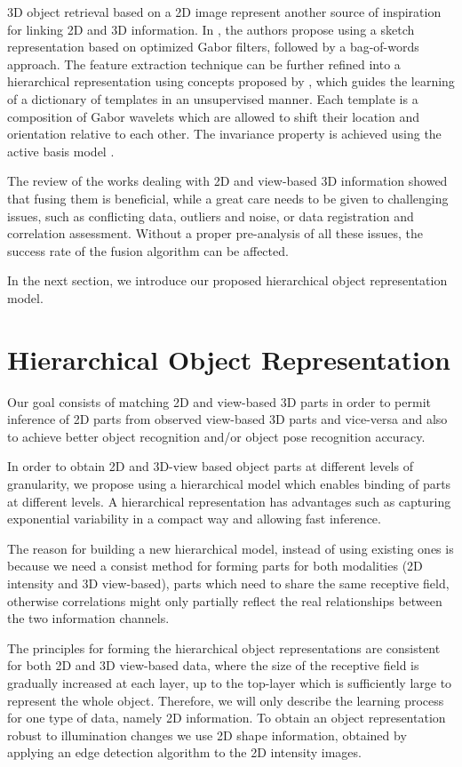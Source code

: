\documentclass[runningheads]{llncs}
\begin{document}
3D object retrieval based on a 2D image represent another source of inspiration for linking 2D and 3D information. In \cite{Eitz2012}, the authors propose using a sketch representation based on optimized Gabor filters, followed by a bag-of-words approach. The feature extraction technique can be further refined into a hierarchical representation using concepts proposed by \cite{Dai2014}, which guides the learning of a dictionary of templates in an unsupervised manner. Each template is a composition of Gabor wavelets which are allowed to shift their location and orientation relative to each other. The invariance property is achieved using the active basis model \cite{Wu2010}.

The review of the works dealing with 2D and view-based 3D information showed that fusing them is beneficial, while a great care needs to be given to challenging issues, such as conflicting data, outliers and noise, or data registration and correlation assessment. Without a proper pre-analysis of all these issues, the success rate of the fusion algorithm can be affected. 

In the next section, we introduce our proposed hierarchical object representation model.  

\section{Hierarchical Object Representation} 
\label{sec:learning}    

Our goal consists of matching 2D and view-based 3D parts in order to permit inference of 2D parts from observed view-based 3D parts and vice-versa and also to achieve better object recognition and/or object pose recognition accuracy.  

In order to obtain 2D and 3D-view based object parts at different levels of granularity, we propose using a hierarchical model which enables binding of parts at different levels. A hierarchical representation has advantages such as capturing exponential variability in a compact way and allowing fast inference.

The reason for building a new hierarchical model, instead of using existing ones is because we need a consist method for forming parts for both modalities (2D intensity and 3D view-based), parts which need to share the same receptive field, otherwise correlations might only partially reflect the real relationships between the two information channels.

The principles for forming the hierarchical object representations are consistent for both 2D and 3D view-based data, where the size of the receptive field is gradually increased at each layer, up to the top-layer which is sufficiently large to represent the whole object. Therefore, we will only describe the learning process for one type of data, namely 2D information. To obtain an object representation robust to illumination changes we use 2D shape information, obtained by applying an edge detection algorithm to the 2D intensity images.
\end{document}

